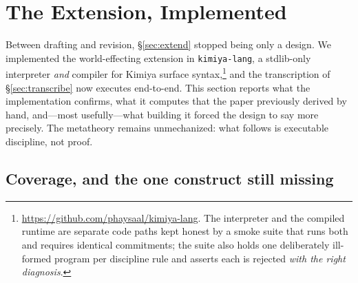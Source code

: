 \documentclass[acmsmall,screen,nonacm]{acmart}
\theoremstyle{acmdefinition}%
\theoremstyle{acmplain}%
\begin{document}
\section{The Extension, Implemented}
\label{sec:impl}

Between drafting and revision, \S\ref{sec:extend} stopped being only a
design. We implemented the world-effecting extension in
\texttt{kimiya-lang}, a stdlib-only interpreter \emph{and} compiler for
Kimiya surface syntax,\footnote{\url{https://github.com/phaysaal/kimiya-lang}.
The interpreter and the compiled runtime are separate code paths kept
honest by a smoke suite that runs both and requires identical
commitments; the suite also holds one deliberately ill-formed program
per discipline rule and asserts each is rejected \emph{with the right
diagnosis}.} and the transcription of \S\ref{sec:transcribe} now
executes end-to-end. This section reports what the implementation
confirms, what it computes that the paper previously derived by hand,
and---most usefully---what building it forced the design to say more
precisely. The metatheory remains unmechanized: what follows is
executable discipline, not proof.

\subsection{Coverage, and the one construct still missing}
\end{document}
